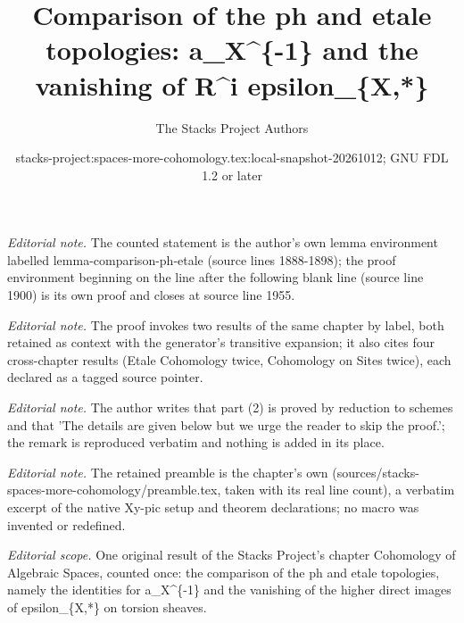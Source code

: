 \documentclass{stacks-project}
\title{Comparison of the ph and etale topologies: a\_X\textasciicircum{}\{-1\} and the vanishing of R\textasciicircum{}i epsilon\_\{X,*\}}
\author{The Stacks Project Authors}
\date{stacks-project:spaces-more-cohomology.tex:local-snapshot-20261012; GNU FDL 1.2 or later}
\theoremstyle{plain}
\theoremstyle{definition}
\theoremstyle{remark}
\numberwithin{equation}{subsection}
\begin{document}
\maketitle
\noindent\textit{Editorial note.} The counted statement is the author's own lemma environment labelled lemma-comparison-ph-etale (source lines 1888-1898); the proof environment beginning on the line after the following blank line (source line 1900) is its own proof and closes at source line 1955.\par\medskip
\noindent\textit{Editorial note.} The proof invokes two results of the same chapter by label, both retained as context with the generator's transitive expansion; it also cites four cross-chapter results (Etale Cohomology twice, Cohomology on Sites twice), each declared as a tagged source pointer.\par\medskip
\noindent\textit{Editorial note.} The author writes that part (2) is proved by reduction to schemes and that 'The details are given below but we urge the reader to skip the proof.'; the remark is reproduced verbatim and nothing is added in its place.\par\medskip
\noindent\textit{Editorial note.} The retained preamble is the chapter's own (sources/stacks-spaces-more-cohomology/preamble.tex, taken with its real line count), a verbatim excerpt of the native Xy-pic setup and theorem declarations; no macro was invented or redefined.\par\medskip
\noindent\textit{Editorial scope.} One original result of the Stacks Project's chapter Cohomology of Algebraic Spaces, counted once: the comparison of the ph and etale topologies, namely the identities for a\_X\textasciicircum{}\{-1\} and the vanishing of the higher direct images of epsilon\_\{X,*\} on torsion sheaves.\par\medskip
\end{document}
